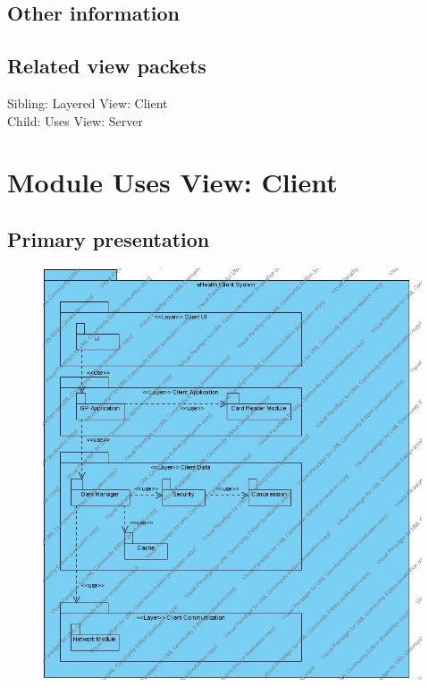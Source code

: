 \documentclass[a4paper,10pt]{article}
\begin{document}
\subsection{Other information}

\subsection{Related view packets}

Sibling: Layered View: Client\\
Child: Uses View: Server\\

\section{Module Uses View: Client}
\label{Module Uses View : Client}

\subsection{Primary presentation}
\begin{center}
    \begin{figure}[h!]
      \includegraphics[width=\textwidth]{../images/UsesView_Client.jpg}
    \end{figure}
  \end{center}
\end{document}
